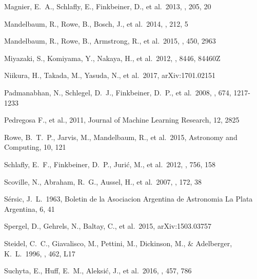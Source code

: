 \documentclass[useamsfonts]{pasj01}
\begin{document}
\begin{thebibliography}{}
     Magnier, E.~A., Schlafly, E.,
             Finkbeiner, D., et al.\ 2013, \apjs, 205, 20

     Mandelbaum, R., Rowe, B.,
            Bosch, J., et al.\ 2014, \apjs, 212, 5

     Mandelbaum, R., Rowe, B.,
             Armstrong, R., et al.\ 2015, \mnras, 450, 2963

     Miyazaki, S., Komiyama, Y., Nakaya,
             H., et al.\ 2012, \procspie, 8446, 84460Z

     Niikura, H., Takada, M., Yasuda, N.,
             et al.\ 2017, arXiv:1701.02151

     Padmanabhan, N., Schlegel,
             D.~J., Finkbeiner, D.~P., et al.\ 2008, \apj, 674, 1217-1233

     Pedregosa F., et al., 2011,
             Journal of Machine Learning Research, 12, 2825

     Rowe, B.~T.~P., Jarvis, M., Mandelbaum, R.,
             et al.\ 2015, Astronomy and Computing, 10, 121

     Schlafly, E.~F., Finkbeiner, D.~P.,
             Juri{\'c}, M., et al.\ 2012, \apj, 756, 158

     Scoville, N., Abraham, R.~G.,
             Aussel, H., et al.\ 2007, \apjs, 172, 38

     S{\'e}rsic, J.~L.\ 1963, Boletin de la
             Asociacion Argentina de Astronomia La Plata Argentina, 6, 41
   
     Spergel, D., Gehrels, N., Baltay, 
             C., et al.\ 2015, arXiv:1503.03757 

     Steidel, C.~C., Giavalisco, M.,
             Pettini, M., Dickinson, M., \& Adelberger, K.~L.\ 1996, \apjl, 462, L17

     Suchyta, E., Huff, E.~M., Aleksi{\'c},
             J., et al.\ 2016, \mnras, 457, 786


\end{thebibliography}
\end{document}
